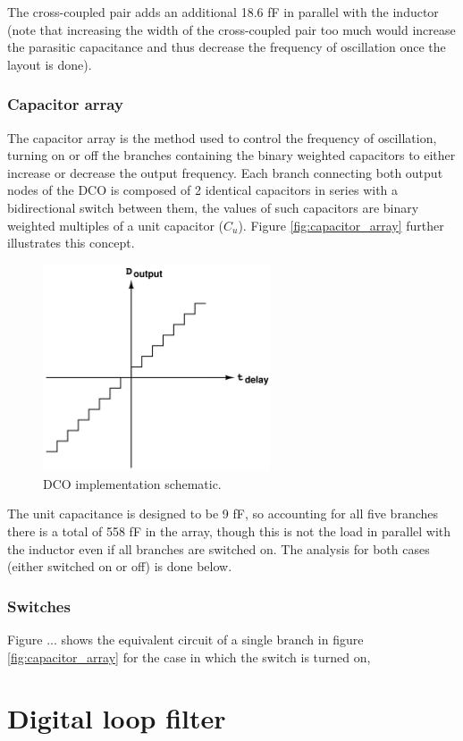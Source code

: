 The cross-coupled pair adds an additional 18.6 fF in parallel with the inductor (note that increasing the width of the cross-coupled pair too much would increase the parasitic capacitance and thus decrease
the frequency of oscillation once the layout is done).

\subsubsection{Capacitor array}
The capacitor array is the method used to control the frequency of oscillation, turning on or off the branches containing the binary weighted capacitors to either increase or decrease the output frequency. Each
branch connecting both output nodes of the DCO is composed of 2 identical capacitors in series with a bidirectional switch between them, the values of such capacitors are binary weighted multiples of a unit capacitor
($C_u$). Figure \ref{fig:capacitor_array} further illustrates this concept.


\begin{figure}[H]
    \centering
    \includegraphics[width=0.6\textwidth]{figures/TDC_shifted_characteristic.png}
    \caption{DCO implementation schematic.}
    \label{fig:DCO_implementation}
\end{figure}

The unit capacitance is designed to be 9 fF, so accounting for all five branches there is a total of 558 fF in the array, though this is not the load in parallel with the inductor even if all branches are switched on.
The analysis for both cases (either switched on or off) is done below.

\subsubsection{Switches}
Figure ... shows the equivalent circuit of a single branch in figure \ref{fig:capacitor_array} for the case in which the switch is turned on, 


\section{Digital loop filter}
